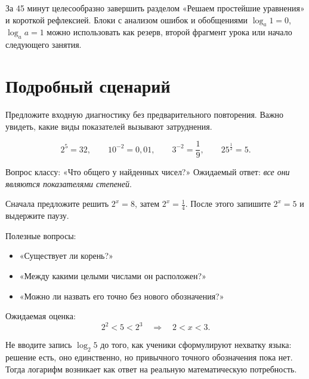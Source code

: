\begin{teacherbox}
  За 45 минут целесообразно завершить разделом «Решаем простейшие
  уравнения» и короткой рефлексией. Блоки с анализом ошибок и обобщениями
  \(\log_a1=0\), \(\log_a a=1\) можно использовать как резерв, второй
  фрагмент урока или начало следующего занятия.
\end{teacherbox}

\section{Подробный сценарий}


Предложите входную диагностику без предварительного повторения. Важно
увидеть, какие виды показателей вызывают затруднения.

\begin{teacherbox}
  \[
    2^5=32,
    \qquad
    10^{-2}=0{,}01,
    \qquad
    3^{-2}=\frac19,
    \qquad
    25^{\frac12}=5.
  \]
\end{teacherbox}

Вопрос классу: «Что общего у найденных чисел?» Ожидаемый ответ:
\textit{все они являются показателями степеней}.


Сначала предложите решить \(2^x=8\), затем \(2^x=\frac14\). После этого
запишите \(2^x=5\) и выдержите паузу.

Полезные вопросы:
\begin{itemize}
  \item «Существует ли корень?»
  \item «Между какими целыми числами он расположен?»
  \item «Можно ли назвать его точно без нового обозначения?»
\end{itemize}

Ожидаемая оценка:
\[
  2^2<5<2^3
  \quad\Longrightarrow\quad
  2<x<3.
\]

\begin{teacherbox}
  Не вводите запись \(\log_2 5\) до того, как ученики сформулируют
  нехватку языка: решение есть, оно единственно, но привычного точного
  обозначения пока нет. Тогда логарифм возникает как ответ на реальную
  математическую потребность.
\end{teacherbox}

